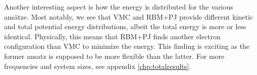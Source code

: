 Another interesting aspect is how the energy is distributed for the various ansätze. Most notably, we see that VMC and RBM+PJ provide different kinetic and total potential energy distributions, albeit the total energy is more or less identical. Physically, this means that RBM+PJ finds another electron configuration than VMC to minimize the energy. This finding is exciting as the former ansatz is supposed to be more flexible than the latter. For more frequencies and system sizes, see appendix \ref{chp:totalresults}.

\begin{figure}
	\centering
	\captionsetup[subfigure]{labelformat=empty}
	\hspace{0.1cm}
	\hspace{-0.cm}
	\hspace{-0.cm}
	\\ [-0.cm]
	

\end{figure}
